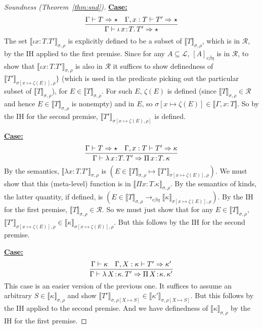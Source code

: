 \documentclass{article}
\newcommand{\choice}[0]{\zeta}
\newcommand{\abs}[4]{{#1}\, #2\! : \! #3.\, #4}
\newcommand{\interp}[1]{\llbracket #1 \rrbracket}
\newcommand{\tpsynth}[0]{\Rightarrow}
\newcommand{\cbe}[0]{c\beta\eta}
\newcommand{\startcase}[1]{\vspace{#1} \noindent\textbf{\underline{Case:}}}
\begin{document}
\begin{proof}[Soundness (Theorem~\ref{thm:snd})]
\startcase{.2cm}
\[
    \infer{\Gamma\vdash\abs{\iota}{x}{T}{T'} \tpsynth \star}{\Gamma \vdash T \tpsynth \star & \Gamma,x:T\vdash T' \tpsynth \star} 
\]
The set $\interp{\iota x:T.T'}_{\sigma,\rho}$ is explicitly defined to
be a subset of $\interp{T}_{\sigma,\rho}$, which is in $\mathcal{R}$,
by the IH applied to the first premise.  Since for any
$A\subseteq\mathcal{L}$, $[A]_{\cbe}$ is in $\mathcal{R}$, to show that
$\interp{\iota x:T.T'}_{\sigma,\rho}$ is also in $\mathcal{R}$ it suffices
to show definedness of $\interp{T'}_{\sigma[x\mapsto \choice(E)],\rho}\}$
(which is used in the predicate picking out the
particular subset of $\interp{T}_{\sigma,\rho}$), for
$E\in\interp{T}_{\sigma,\rho}$.  For such $E$, $\choice(E)$ is defined
(since $\interp{T}_{\sigma,\rho}\in\mathcal{R}$ and hence $E\in\interp{T}_{\sigma,\rho}$ is nonempty)
and in $E$,
so $\sigma[x\mapsto\choice(E)]\in\interp{\Gamma,x:T}$.  So
by the IH for the second premise,
$\interp{T'}_{\sigma[x\mapsto\choice(E),\rho]}$ is defined.

\startcase{.2cm}
\[
 \infer{\Gamma\vdash\abs{\lambda}{x}{T}{T'} \tpsynth \abs{\Pi}{x}{T}{\kappa}}{\Gamma \vdash T \tpsynth \star & \Gamma,x:T\vdash T'\tpsynth\kappa}
\]
By the semantics, $\interp{\lambda x:T.T'}_{\sigma,\rho}$ is
$(E\in\interp{T}_{\sigma,\rho} \mapsto \interp{T'}_{\sigma[x\mapsto
  \choice(E)],\rho})$.  We must show that this (meta-level) function
is in $\interp{\Pi x:T.\kappa}_{\sigma,\rho}$.  By the semantics of
kinds, the latter quantity, if defined, is
$(E\in\interp{T}_{\sigma,\rho} \to_{\cbe}
\interp{\kappa}_{\sigma[x\mapsto \choice(E)],\rho})$.
By the IH for the first premise, $\interp{T}_{\sigma,\rho}\in\mathcal{R}$.
So we must just show that for any $E\in\interp{T}_{\sigma,\rho}$,
$\interp{T'}_{\sigma[x\mapsto
  \choice(E)],\rho}\in\interp{\kappa}_{\sigma[x\mapsto
  \choice(E)],\rho}$.  But this follows by the IH for the second
premise.

\startcase{.2cm}
\[
\infer{\Gamma\vdash\abs{\lambda}{X}{\kappa}{T'} \tpsynth \abs{\Pi}{X}{\kappa}{\kappa'}}
      {\Gamma \vdash \kappa & \Gamma,X:\kappa\vdash T'\tpsynth\kappa'} 
\]
This case is an easier version of the previous one.  It suffices to
assume an arbitrary $S\in\interp{\kappa}_{\sigma,\rho}$ and show
$\interp{T'}_{\sigma,\rho[X\mapsto S]}\in\interp{\kappa'}_{\sigma,\rho[X\mapsto S]}$.  But this follows
by the IH applied to the second premise.  And we have definedness of
$\interp{\kappa}_{\sigma,\rho}$ by the IH for the first premise.


\end{proof}
\end{document}

